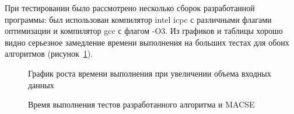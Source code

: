 При тестировании было рассмотрено несколько сборок разработанной программы: был использован компилятор intel icpc с различными флагами оптимизации и компилятор gcc с флагом -O3. Из графиков и таблицы хорошо видно серьезное замедление времени выполнения на больших тестах для обоих алгоритмов (рисунок~\ref{ris:multyvsMACSE}). 

\begin{figure}[h]
	\begin{minipage}[h]{0.49\linewidth}
	\end{minipage}
	\hfill
	\begin{minipage}[h]{0.49\linewidth}
	\end{minipage}
	\caption{График роста времени выполнения при увеличении объема входных данных}
	\label{ris:multyvsMACSE}
\end{figure}

\begin{landscape}
\begin{figure}[h]
	\caption{Время выполнения тестов разработанного алгоритма и MACSE}
	\label{ris:gist}
\end{figure}
\end{landscape}

